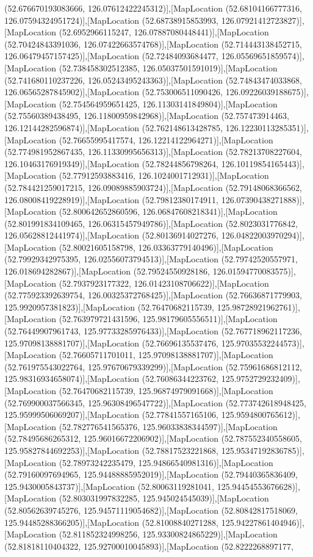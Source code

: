 (52.676670193083666, 126.07612422245312)],[MapLocation (52.68104166777316, 126.07594324951724)],[MapLocation (52.68738915853993, 126.07921412723827)],[MapLocation (52.6952966115247, 126.07887080448441)],[MapLocation (52.70424843391036, 126.07422663574768)],[MapLocation (52.714443138452715, 126.06479457157425)],[MapLocation (52.72484093684477, 126.05569651859574)],[MapLocation (52.738458302512385, 126.05037501591019)],[MapLocation (52.741680110237226, 126.05243495243363)],[MapLocation (52.74843474033868, 126.06565287845902)],[MapLocation (52.753006511090426, 126.09226039188675)],[MapLocation (52.754564959651425, 126.11303141849804)],[MapLocation (52.75560389438495, 126.11800959842968)],[MapLocation (52.757473914463, 126.12144282596874)],[MapLocation (52.762148613428785, 126.12230113285351)],[MapLocation (52.76655995417574, 126.12214122964271)],[MapLocation (52.774981952867435, 126.11330995656313)],[MapLocation (52.78213708227604, 126.10463176919349)],[MapLocation (52.78244856798264, 126.10119854165443)],[MapLocation (52.77912593883416, 126.1024001712931)],[MapLocation (52.784421259017215, 126.09089885903724)],[MapLocation (52.79148068366562, 126.08008419228919)],[MapLocation (52.79812380174911, 126.07390438271888)],[MapLocation (52.800642652860596, 126.06847608218341)],[MapLocation (52.801991834109465, 126.06315457949786)],[MapLocation (52.8023031776842, 126.05628812441974)],[MapLocation (52.80136914027276, 126.04822003970294)],[MapLocation (52.80021605158798, 126.03363779140496)],[MapLocation (52.79929342975395, 126.02556073794513)],[MapLocation (52.79742520557971, 126.018694282867)],[MapLocation (52.79524550928186, 126.01594770083575)],[MapLocation (52.7937923177322, 126.01423108706622)],[MapLocation (52.775923392639754, 126.00325372768425)],[MapLocation (52.76636871779903, 125.9920957381823)],[MapLocation (52.76470682115739, 125.98728921962761)],[MapLocation (52.763979721431596, 125.98179605556511)],[MapLocation (52.76449907961743, 125.97733285976433)],[MapLocation (52.767718962117236, 125.97098138881707)],[MapLocation (52.76696135537476, 125.97035532244573)],[MapLocation (52.76605711701011, 125.97098138881707)],[MapLocation (52.761975543022764, 125.97670679339299)],[MapLocation (52.75961686812112, 125.98316934658074)],[MapLocation (52.76086344223762, 125.9752729232409)],[MapLocation (52.76470682115739, 125.96874979091668)],[MapLocation (52.769900037566345, 125.96308496547722)],[MapLocation (52.773742618948425, 125.95999506069207)],[MapLocation (52.77841557165106, 125.9594800765612)],[MapLocation (52.782776541565376, 125.96033838344597)],[MapLocation (52.78495686265312, 125.96016672206902)],[MapLocation (52.787552340558605, 125.95827844692253)],[MapLocation (52.78817523221868, 125.95347192836785)],[MapLocation (52.78973242235479, 125.94866540981316)],[MapLocation (52.79160097694965, 125.94488885952019)],[MapLocation (52.79440365836409, 125.9430005843737)],[MapLocation (52.80063119281041, 125.94454553676628)],[MapLocation (52.803031997832285, 125.945024545039)],[MapLocation (52.80562639745276, 125.94571119054682)],[MapLocation (52.80842817518069, 125.94485288366205)],[MapLocation (52.81008840271288, 125.94227861404946)],[MapLocation (52.811852324998256, 125.93300824865229)],[MapLocation (52.81818110404322, 125.92700010045893)],[MapLocation (52.8222268897177, 